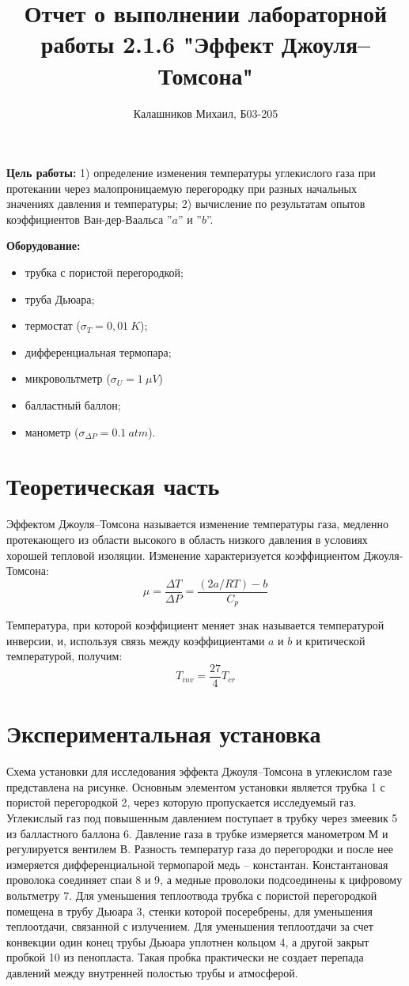 \documentclass[14pt, a4paper]{report}
\title{\textbf{Отчет о выполнении лабораторной работы 2.1.6 "Эффект Джоуля–Томсона"}}
\author{Калашников Михаил, Б03-205}
\date{}
\begin{document}
\maketitle

\textbf{Цель работы:} 1) определение изменения температуры углекислого газа при протекании через малопроницаемую перегородку при разных начальных значениях давления и температуры; 2) вычисление по результатам опытов коэффициентов Ван-дер-Ваальса ''$a$'' и ''$b$''.  

\textbf{Оборудование:} 
\begin{itemize}
  \item трубка с пористой перегородкой;
  \item  труба Дьюара;
  \item термостат ($\sigma_T=0,01\ K$);
  \item дифференциальная термопара;
  \item микровольтметр ($\sigma_U=1\ \mu V$)
  \item балластный баллон;
  \item манометр ($\sigma_{\Delta P}=0.1\ atm$).
\end{itemize}

\section{Теоретическая часть}

Эффектом Джоуля–Томсона называется изменение температуры газа, медленно протекающего из области высокого в область низкого давления в условиях хорошей тепловой изоляции. Изменение характеризуется коэффициентом Джоуля-Томсона:
\[\mu=\frac{\Delta T}{\Delta P}=\frac{(2a/RT)-b}{C_p}\]

Температура, при которой коэффициент меняет знак называется температурой инверсии, и, используя связь между коэффициентами $a$ и $b$ и критической температурой, получим:
\[T_{inv}=\frac{27}{4}T_{cr}\]

\section{Экспериментальная установка}

Схема установки для исследования эффекта Джоуля–Томсона в углекислом газе представлена на рисунке. Основным элементом установки является трубка 1 с пористой перегородкой 2, через которую пропускается исследуемый газ. Углекислый газ под повышенным давлением поступает в трубку через змеевик 5 из балластного баллона 6. Давление газа в трубке измеряется манометром М и регулируется вентилем В. Разность температур газа до перегородки и после нее измеряется
дифференциальной термопарой медь -- константан. Константановая проволока соединяет спаи 8 и 9, а медные проволоки подсоединены к цифровому вольтметру 7.  Для уменьшения теплоотвода трубка с пористой перегородкой помещена в трубу Дьюара 3, стенки которой посеребрены, для уменьшения теплоотдачи, связанной с излучением. Для уменьшения теплоотдачи за счет конвекции один конец трубы Дьюара уплотнен кольцом 4, а другой закрыт пробкой 10 из пенопласта. Такая пробка практически не создает перепада давлений между внутренней полостью
трубы и атмосферой.
\end{document}
